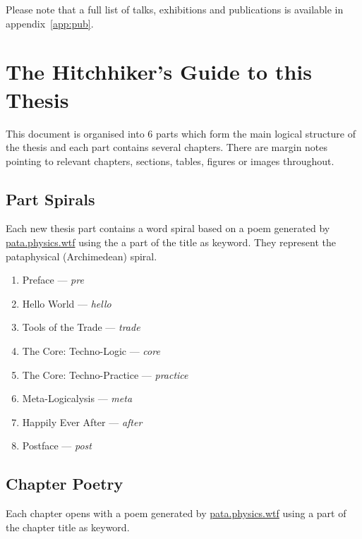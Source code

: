 Please note that a full list of talks, exhibitions and publications is available in appendix~\ref{app:pub}.


\section{The Hitchhiker's Guide to this Thesis}

%   

% 

This document is organised into 6 parts which form the main logical structure of the thesis and each part contains several chapters. There are margin notes pointing to relevant chapters, sections, tables, figures or images throughout.

\subsection*{Part Spirals}

Each new thesis part contains a word spiral based on a poem generated by \url{pata.physics.wtf} using the a part of the title as keyword. They represent the pataphysical (Archimedean) spiral.

\begin{enumerate}
  \item Preface --- \emph{pre}
  \item Hello World --- \emph{hello}
  \item Tools of the Trade --- \emph{trade}
  \item The Core: Techno-Logic --- \emph{core}
  \item The Core: Techno-Practice --- \emph{practice}
  \item Meta-Logicalysis --- \emph{meta}
  \item Happily Ever After --- \emph{after}
  \item Postface --- \emph{post}
\end{enumerate}


\subsection*{Chapter Poetry}

Each chapter opens with a poem generated by \url{pata.physics.wtf} using a part of the chapter title as keyword.

